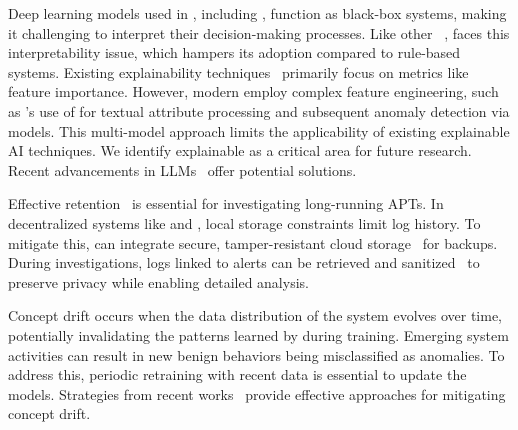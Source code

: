  Deep learning models used in \pids, including \Sys, function as black-box systems, making it challenging to interpret their decision-making processes. Like other \pids~\cite{flash2024,cheng2023kairos,yangprographer}, \Sys faces this interpretability issue, which hampers its adoption compared to rule-based systems. Existing explainability techniques~\cite{antwarg2021explaining,brown2018recurrent,ardito2021revisiting,hwang2021sfd} primarily focus on metrics like feature importance. However, modern \pids employ complex feature engineering, such as \flash's use of \wordvec for textual attribute processing and subsequent anomaly detection via \gnnshort models. This multi-model approach limits the applicability of existing explainable AI techniques. We identify explainable \pids as a critical area for future research. Recent advancements in LLMs~\cite{chang2024survey} offer potential solutions.

 Effective retention~\cite{wilbert2012log,rapsheet2020} is essential for investigating long-running APTs. In decentralized systems like \Sys and \disdet, local storage constraints limit log history. To mitigate this, \Sys can integrate secure, tamper-resistant cloud storage~\cite{kumar2018secure,hardlog} for backups. During investigations, logs linked to alerts can be retrieved and sanitized~\cite{portillo2019towards} to preserve privacy while enabling detailed analysis.



 Concept drift occurs when the data distribution of the system evolves over time, potentially invalidating the patterns learned by \Sys during training. Emerging system activities can result in new benign behaviors being misclassified as anomalies. To address this, periodic retraining with recent data is essential to update the models. Strategies from recent works~\cite{lu2018learning, barbero2022transcending,jordaney2017transcend} provide effective approaches for mitigating concept drift.

